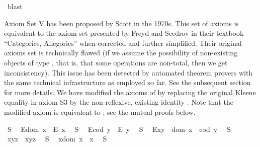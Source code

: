 \begin{isabellebody}
\ blast%
\endisatagproof
{\isafoldproof}%
%
\isadelimproof
%
\endisadelimproof
%
\isamarkuptrue%
%
\begin{isamarkuptext}%
Axiom Set V has been proposed by Scott \cite{Scott79} in the 1970s. This set of
 axioms is equivalent to the axiom set presented by Freyd and Scedrov in their textbook
 ``Categories, Allegories'' \cite{FreydScedrov90} when corrected and further simplified. 
 Their original axioms set is technically flawed (if we assume the possibility of 
  non-existing objects of type , that is, that some operations are non-total, 
 then we get inconsistency). This issue has been detected by automated theorem provers
 with the same technical infrastructure as employed so far. See the subsequent section  
 for more details. 
 We have modified the axioms of \cite{FreydScedrov90} by replacing the original Kleene 
 equality \isa{{\isasymcong}} in axiom S3 by the
 non-reflexive, existing identity \isa{{\isasymsimeq}}. Note that the modified axiom  is equivalent to ;
 see the mutual proofs below.%
\end{isamarkuptext}\isamarkuptrue%
\ S{}{\isacharcolon}\ %
\ {\isachardoublequoteopen}E{\isacharparenleft}dom\ x{\isacharparenright}\ \isactrlbold {\isasymrightarrow}\ E\ x{\isachardoublequoteclose}\ \isanewline
\ S{}{\isacharcolon}\ %
\ {\isachardoublequoteopen}E{\isacharparenleft}cod\ y{\isacharparenright}\ \isactrlbold {\isasymrightarrow}\ E\ y{\isachardoublequoteclose}\ \isanewline
\ S{}{\isacharcolon}\ %
\ {\isachardoublequoteopen}E{\isacharparenleft}x{\isasymcdot}y{\isacharparenright}\ \isactrlbold {\isasymleftrightarrow}\ dom\ x\ {\isasymsimeq}\ cod\ y{\isachardoublequoteclose}\ \isanewline
\ S{}{\isacharcolon}\ %
\ {\isachardoublequoteopen}x{\isasymcdot}{\isacharparenleft}y{\isasymcdot}z{\isacharparenright}\ {\isasymcong}\ {\isacharparenleft}x{\isasymcdot}y{\isacharparenright}{\isasymcdot}z{\isachardoublequoteclose}\ \isanewline
\ S{}{\isacharcolon}\ %
\ {\isachardoublequoteopen}x{\isasymcdot}{\isacharparenleft}dom\ x{\isacharparenright}\ {\isasymcong}\ x{\isachardoublequoteclose}\ \isanewline
\ S{}{\isacharcolon}\ %

\end{isabellebody}
